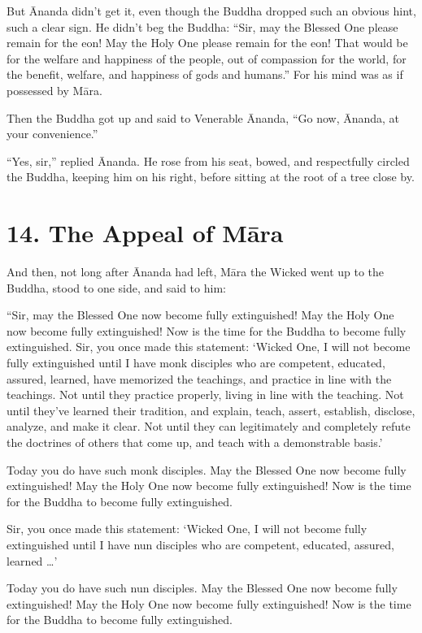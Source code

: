 \documentclass[12pt,openany]{book}%
\begin{document}
But Ānanda didn’t get it, even though the Buddha dropped such an obvious hint, such a clear sign. He didn’t beg the Buddha: “Sir, may the Blessed One please remain for the eon! May the Holy One please remain for the eon! That would be for the welfare and happiness of the people, out of compassion for the world, for the benefit, welfare, and happiness of gods and humans.” For his mind was as if possessed by \textsanskrit{Māra}. 

Then the Buddha got up and said to Venerable Ānanda, “Go now, Ānanda, at your convenience.” 

“Yes, sir,” replied Ānanda. He rose from his seat, bowed, and respectfully circled the Buddha, keeping him on his right, before sitting at the root of a tree close by. 

\section*{14. The Appeal of \textsanskrit{Māra} }

And then, not long after Ānanda had left, \textsanskrit{Māra} the Wicked went up to the Buddha, stood to one side, and said to him: 

“Sir, may the Blessed One now become fully extinguished! May the Holy One now become fully extinguished! Now is the time for the Buddha to become fully extinguished. Sir, you once made this statement: ‘Wicked One, I will not become fully extinguished until I have monk disciples who are competent, educated, assured, learned, have memorized the teachings, and practice in line with the teachings. Not until they practice properly, living in line with the teaching. Not until they’ve learned their tradition, and explain, teach, assert, establish, disclose, analyze, and make it clear. Not until they can legitimately and completely refute the doctrines of others that come up, and teach with a demonstrable basis.’ 

Today you do have such monk disciples. May the Blessed One now become fully extinguished! May the Holy One now become fully extinguished! Now is the time for the Buddha to become fully extinguished. 

Sir, you once made this statement: ‘Wicked One, I will not become fully extinguished until I have nun disciples who are competent, educated, assured, learned …’ 

Today you do have such nun disciples. May the Blessed One now become fully extinguished! May the Holy One now become fully extinguished! Now is the time for the Buddha to become fully extinguished. 
\end{document}
